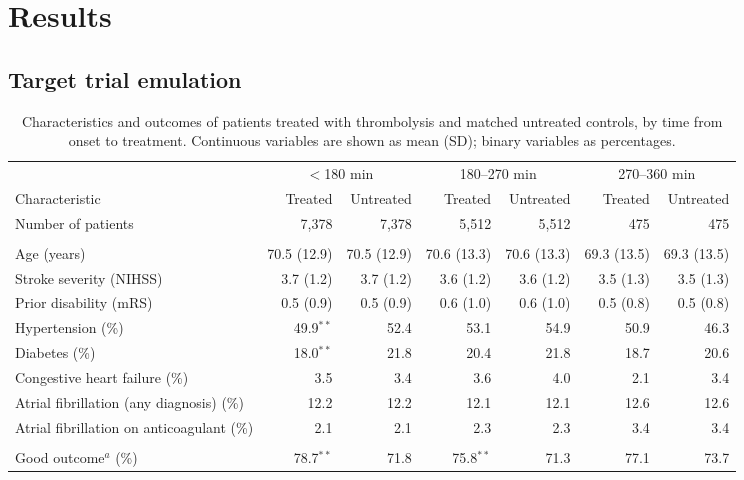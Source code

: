 \section{Results}

\subsection{Target trial emulation}

\begin{table}[H]
\centering
\small
\caption{Characteristics and outcomes of patients treated with thrombolysis and matched untreated controls, by time from onset to treatment. Continuous variables are shown as mean (SD); binary variables as percentages.}
\label{tab:characteristics}
\begin{tabular}{l rr rr rr}
\toprule
 & \multicolumn{2}{c}{$<$180 min} & \multicolumn{2}{c}{180--270 min} & \multicolumn{2}{c}{270--360 min} \\
\cmidrule(lr){2-3}\cmidrule(lr){4-5}\cmidrule(lr){6-7}
Characteristic & Treated & Untreated & Treated & Untreated & Treated & Untreated \\
\midrule
Number of patients & 7,378 & 7,378 & 5,512 & 5,512 & 475 & 475 \\
\addlinespace
\multicolumn{7}{l}{\textit{Baseline characteristics}} \\
\quad Age (years) & 70.5 (12.9) & 70.5 (12.9) & 70.6 (13.3) & 70.6 (13.3) & 69.3 (13.5) & 69.3 (13.5) \\
\quad Stroke severity (NIHSS) & 3.7 (1.2) & 3.7 (1.2) & 3.6 (1.2) & 3.6 (1.2) & 3.5 (1.3) & 3.5 (1.3) \\
\quad Prior disability (mRS) & 0.5 (0.9) & 0.5 (0.9) & 0.6 (1.0) & 0.6 (1.0) & 0.5 (0.8) & 0.5 (0.8) \\
\quad Hypertension (\%) & 49.9$^{**}$ & 52.4 & 53.1 & 54.9 & 50.9 & 46.3 \\
\quad Diabetes (\%) & 18.0$^{**}$ & 21.8 & 20.4 & 21.8 & 18.7 & 20.6 \\
\quad Congestive heart failure (\%) & 3.5 & 3.4 & 3.6 & 4.0 & 2.1 & 3.4 \\
\quad Atrial fibrillation (any diagnosis) (\%) & 12.2 & 12.2 & 12.1 & 12.1 & 12.6 & 12.6 \\
\quad Atrial fibrillation on anticoagulant (\%) & 2.1 & 2.1 & 2.3 & 2.3 & 3.4 & 3.4 \\
\addlinespace
\multicolumn{7}{l}{\textit{Outcomes}} \\
\quad Good outcome$^{a}$ (\%) & 78.7$^{**}$ & 71.8 & 75.8$^{**}$ & 71.3 & 77.1 & 73.7 \\

\end{tabular}
\end{table}
